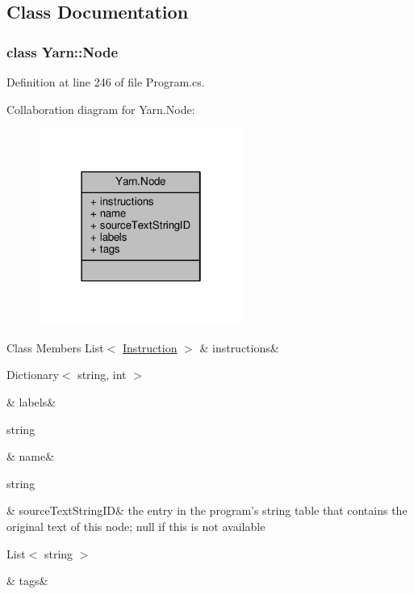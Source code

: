 \subsection{Class Documentation}
\label{a00367}
\hypertarget{a00045_a00367}{}
\subsubsection{class Yarn\-:\-:Node}


Definition at line 246 of file Program.\-cs.



Collaboration diagram for Yarn.\-Node\-:
\nopagebreak
\begin{figure}[H]
\begin{center}
\leavevmode
\includegraphics[width=190pt]{a00381}
\end{center}
\end{figure}
\begin{DoxyFields}{Class Members}
\hypertarget{a00045_a156723a9252b62d288ddf611939ea7c3}{List$<$ \hyperlink{a00113}{Instruction} $>$}\label{a00045_a156723a9252b62d288ddf611939ea7c3}
&
instructions&
\\
\hline

\hypertarget{a00045_a9afa49f4fbc72e806a0210cb4198f12e}{Dictionary$<$ string, int $>$}\label{a00045_a9afa49f4fbc72e806a0210cb4198f12e}
&
labels&
\\
\hline

\hypertarget{a00045_a107b0de3fcfc65e99913edc01b5ce9db}{string}\label{a00045_a107b0de3fcfc65e99913edc01b5ce9db}
&
name&
\\
\hline

\hypertarget{a00045_a09c6af5b50925d0876283b84281b3ed4}{string}\label{a00045_a09c6af5b50925d0876283b84281b3ed4}
&
source\-Text\-String\-I\-D&
the entry in the program's string table that contains the original text of this node; null if this is not available \\
\hline

\hypertarget{a00045_a811086feceebbe79a74eba071c1d516b}{List$<$ string $>$}\label{a00045_a811086feceebbe79a74eba071c1d516b}
&
tags&
\\
\hline

\end{DoxyFields}
